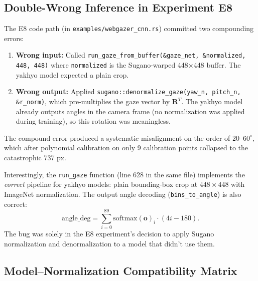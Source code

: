 \documentclass[11pt,a4paper]{article}
\begin{document}
\subsection{Double-Wrong Inference in Experiment E8}

The E8 code path (in \texttt{examples/webgazer\_cnn.rs}) committed two compounding errors:

\begin{enumerate}
  \item \textbf{Wrong input:} Called \texttt{run\_gaze\_from\_buffer(\&gaze\_net, \&normalized, 448, 448)} where \texttt{normalized} is the Sugano-warped 448×448 buffer. The yakhyo model expected a plain crop.
  \item \textbf{Wrong output:} Applied \texttt{sugano::denormalize\_gaze(yaw\_n, pitch\_n, \&r\_norm)}, which pre-multiplies the gaze vector by $\mathbf{R}^T$. The yakhyo model already outputs angles in the camera frame (no normalization was applied during training), so this rotation was meaningless.
\end{enumerate}

The compound error produced a systematic misalignment on the order of $20$--$60^\circ$, which after polynomial calibration on only 9 calibration points collapsed to the catastrophic 737 px.

Interestingly, the \texttt{run\_gaze} function (line 628 in the same file) implements the \textit{correct} pipeline for yakhyo models: plain bounding-box crop at $448\times448$ with ImageNet normalization. The output angle decoding (\texttt{bins\_to\_angle}) is also correct:
\begin{equation}
  \text{angle\_deg} = \sum_{i=0}^{89} \text{softmax}(\mathbf{o})_i \cdot (4i - 180).
\end{equation}
The bug was solely in the E8 experiment's decision to apply Sugano normalization and denormalization to a model that didn't use them.

\subsection{Model--Normalization Compatibility Matrix}
\end{document}
